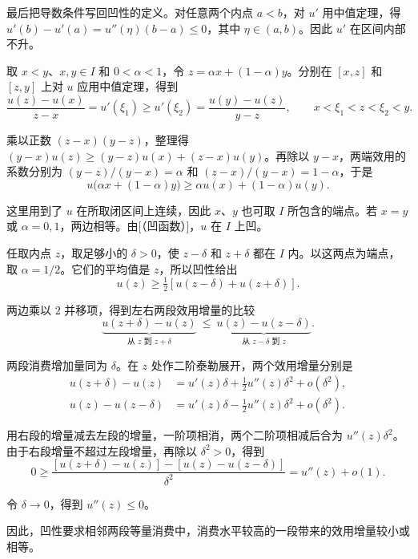 \begin{solution}[label-content={证明（\WJRef{thm:wj-seven-1}{定理~}[（凸偏好与单期效用的凹性）]）},blank-type=none]
最后把导数条件写回凹性的定义。对任意两个内点 $a<b$，对 $u'$ 用中值定理，得 $u'(b)-u'(a)=u''(\eta)(b-a)\le0$，其中 $\eta\in(a,b)$。因此 $u'$ 在区间内部不升。

取 $x<y$、$x,y\in I$ 和 $0<\alpha<1$，令 $z=\alpha x+(1-\alpha)y$。分别在 $[x,z]$ 和 $[z,y]$ 上对 $u$ 应用中值定理，得到
\[
 \frac{u(z)-u(x)}{z-x}
 =u'(\xi_1)\ge u'(\xi_2)
 =\frac{u(y)-u(z)}{y-z},
 \qquad x<\xi_1<z<\xi_2<y.
\]

乘以正数 $(z-x)(y-z)$，整理得 $(y-x)u(z)\ge(y-z)u(x)+(z-x)u(y)$。再除以 $y-x$，两端效用的系数分别为 $(y-z)/(y-x)=\alpha$ 和 $(z-x)/(y-x)=1-\alpha$，于是
\[
 u\bigl(\alpha x+(1-\alpha)y\bigr)\ge\alpha u(x)+(1-\alpha)u(y).
\]

这里用到了 $u$ 在所取闭区间上连续，因此 $x$、$y$ 也可取 $I$ 所包含的端点。若 $x=y$ 或 $\alpha=0,1$，两边相等。由[（凹函数）]，$u$ 在 $I$ 上凹。
\end{solution}

\begin{solution}[label-content={证明（\WJRef{thm:wj-seven-2}{定理~}[（凹函数的二阶导数）]）},blank-type=none]
任取内点 $z$，取足够小的 $\delta>0$，使 $z-\delta$ 和 $z+\delta$ 都在 $I$ 内。以这两点为端点，取 $\alpha=1/2$。它们的平均值是 $z$，所以凹性给出
\[
 u(z)\ge\tfrac12[u(z-\delta)+u(z+\delta)].
\]

两边乘以 $2$ 并移项，得到左右两段效用增量的比较
\[
 \underbrace{u(z+\delta)-u(z)}_{\text{从 }z\text{ 到 }z+\delta}
 \ \le\
 \underbrace{u(z)-u(z-\delta)}_{\text{从 }z-\delta\text{ 到 }z}.
\]

两段消费增加量同为 $\delta$。在 $z$ 处作二阶泰勒展开，两个效用增量分别是
\[
 \begin{aligned}
 u(z+\delta)-u(z)&=u'(z)\delta+\tfrac12 u''(z)\delta^2+o(\delta^2),\\
 u(z)-u(z-\delta)&=u'(z)\delta-\tfrac12 u''(z)\delta^2+o(\delta^2).
 \end{aligned}
\]

用右段的增量减去左段的增量，一阶项相消，两个二阶项相减后合为 $u''(z)\delta^2$。由于右段增量不超过左段增量，再除以 $\delta^2>0$，得到
\[
 0\ge
 \frac{[u(z+\delta)-u(z)]-[u(z)-u(z-\delta)]}{\delta^2}
 =u''(z)+o(1).
\]

令 $\delta\to0$，得到 $u''(z)\le0$。
\end{solution}

因此，凹性要求相邻两段等量消费中，消费水平较高的一段带来的效用增量较小或相等。

